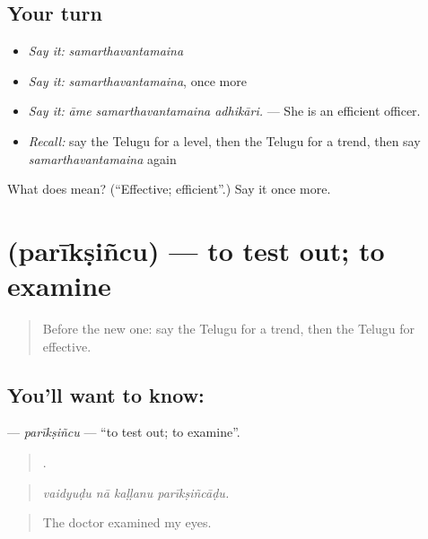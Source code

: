 \subsection*{Your turn}
\begin{itemize}
\raggedright
  \item \emph{Say it:} \emph{samarthavantamaina}
  \item \emph{Say it:} \emph{samarthavantamaina}, once more
  \item \emph{Say it:} \emph{āme samarthavantamaina adhikāri.} — She is an efficient officer.
  \item \emph{Recall:} say the Telugu for a level, then the Telugu for a trend, then say \emph{samarthavantamaina} again
\end{itemize}

\begin{tcolorbox}[breakable,colback=teal!4,colframe=teal!35!black,title={Before you move on}]
What does  mean? (\textquotedblleft{}Effective; efficient\textquotedblright{}.) Say it once more.
\end{tcolorbox}
\section[\texorpdfstring{\te{పరీక్షించు} (parīkṣiñcu)}{పరీక్షించు (parīkṣiñcu)}]{ (parīkṣiñcu) — to test out; to examine}

\label{lesson:TE-C431-pariksincu}



\begin{quote}
Before the new one: say the Telugu for a trend, then the Telugu for effective.
\end{quote}

\subsection*{You'll want to know: }
\textbf{} — \emph{parīkṣiñcu} — \textquotedblleft{}to test out; to examine\textquotedblright{}.

\begin{quote}
   .
\end{quote}

\begin{quote}
\emph{vaidyuḍu nā kaḷḷanu parīkṣiñcāḍu.}
\end{quote}

\begin{quote}
The doctor examined my eyes.
\end{quote}

